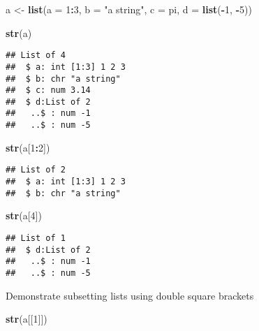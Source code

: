 \documentclass[
]{article}
\newenvironment{Shaded}{\begin{snugshade}}{\end{snugshade}}
\newcommand{\AttributeTok}[1]{\textcolor[rgb]{0.13,0.29,0.53}{#1}}
\newcommand{\DecValTok}[1]{\textcolor[rgb]{0.00,0.00,0.81}{#1}}
\newcommand{\FunctionTok}[1]{\textcolor[rgb]{0.13,0.29,0.53}{\textbf{#1}}}
\newcommand{\NormalTok}[1]{#1}
\newcommand{\OtherTok}[1]{\textcolor[rgb]{0.56,0.35,0.01}{#1}}
\newcommand{\SpecialCharTok}[1]{\textcolor[rgb]{0.81,0.36,0.00}{\textbf{#1}}}
\newcommand{\StringTok}[1]{\textcolor[rgb]{0.31,0.60,0.02}{#1}}
\begin{document}
\begin{Shaded}
\begin{Highlighting}[]
\NormalTok{a }\OtherTok{\textless{}{-}} \FunctionTok{list}\NormalTok{(}\AttributeTok{a =} \DecValTok{1}\SpecialCharTok{:}\DecValTok{3}\NormalTok{, }\AttributeTok{b =} \StringTok{"a string"}\NormalTok{, }\AttributeTok{c =}\NormalTok{ pi, }\AttributeTok{d =} \FunctionTok{list}\NormalTok{(}\SpecialCharTok{{-}}\DecValTok{1}\NormalTok{, }\SpecialCharTok{{-}}\DecValTok{5}\NormalTok{))}
\end{Highlighting}
\end{Shaded}

\begin{Shaded}
\begin{Highlighting}[]
\FunctionTok{str}\NormalTok{(a)}
\end{Highlighting}
\end{Shaded}

\begin{verbatim}
## List of 4
##  $ a: int [1:3] 1 2 3
##  $ b: chr "a string"
##  $ c: num 3.14
##  $ d:List of 2
##   ..$ : num -1
##   ..$ : num -5
\end{verbatim}

\begin{Shaded}
\begin{Highlighting}[]
\FunctionTok{str}\NormalTok{(a[}\DecValTok{1}\SpecialCharTok{:}\DecValTok{2}\NormalTok{])}
\end{Highlighting}
\end{Shaded}

\begin{verbatim}
## List of 2
##  $ a: int [1:3] 1 2 3
##  $ b: chr "a string"
\end{verbatim}

\begin{Shaded}
\begin{Highlighting}[]
\FunctionTok{str}\NormalTok{(a[}\DecValTok{4}\NormalTok{])}
\end{Highlighting}
\end{Shaded}

\begin{verbatim}
## List of 1
##  $ d:List of 2
##   ..$ : num -1
##   ..$ : num -5
\end{verbatim}

Demonstrate subsetting lists using double square brackets

\begin{Shaded}
\begin{Highlighting}[]
\FunctionTok{str}\NormalTok{(a[[}\DecValTok{1}\NormalTok{]])}
\end{Highlighting}
\end{Shaded}
\end{document}
